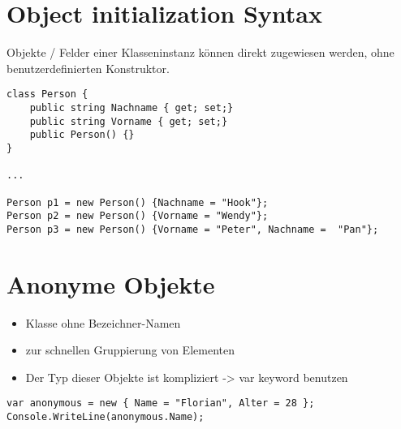 \section{Object initialization Syntax}

Objekte / Felder einer Klasseninstanz können direkt zugewiesen werden, ohne benutzerdefinierten Konstruktor.
\begin{lstlisting}[language={[Sharp]C}]
class Person { 
	public string Nachname { get; set;} 
	public string Vorname { get; set;} 
	public Person() {} 
}

...

Person p1 = new Person() {Nachname = "Hook"}; 
Person p2 = new Person() {Vorname = "Wendy"}; 
Person p3 = new Person() {Vorname = "Peter", Nachname =  "Pan"};
\end{lstlisting}

\section{Anonyme Objekte}

\begin{itemize}
\item Klasse ohne Bezeichner-Namen
\item zur schnellen Gruppierung von Elementen 
\item Der Typ dieser Objekte ist kompliziert -{\textgreater} var keyword benutzen
\end{itemize}

\begin{lstlisting}[language={[Sharp]C}]
var anonymous = new { Name = "Florian", Alter = 28 };
Console.WriteLine(anonymous.Name);
\end{lstlisting}